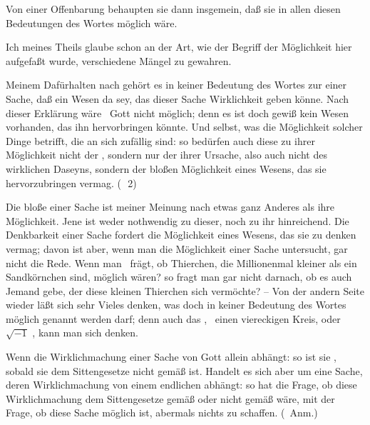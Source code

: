 \begin{aufza}
\item Von einer Offenbarung behaupten sie dann insgemein, daß sie in allen diesen Bedeutungen des Wortes möglich wäre.
\item Ich meines Theils glaube schon an der Art, wie der Begriff der Möglichkeit hier aufgefaßt wurde, verschiedene Mängel zu gewahren.
\begin{aufzb}
\item Meinem Dafürhalten nach gehört es in keiner Bedeutung des Wortes zur  einer Sache, daß ein Wesen da sey, das dieser Sache Wirklichkeit geben könne. Nach dieser Erklärung wäre \zB\ Gott nicht möglich; denn es ist doch gewiß kein Wesen vorhanden, das ihn hervorbringen könnte. Und selbst, was die Möglichkeit solcher Dinge betrifft, die an sich zufällig sind: so bedürfen auch diese zu ihrer Möglichkeit nicht der , sondern nur der  ihrer Ursache, also auch nicht des wirklichen Daseyns, sondern der bloßen Möglichkeit eines Wesens, das sie hervorzubringen vermag. (\ \no\,2)
\item Die bloße  einer Sache ist meiner Meinung nach etwas ganz Anderes als ihre Möglichkeit. Jene ist weder nothwendig zu dieser, noch zu ihr hinreichend. Die Denkbarkeit einer Sache fordert die Möglichkeit eines Wesens, das sie zu denken vermag; davon ist aber, wenn man die Möglichkeit einer Sache  untersucht, gar nicht die Rede. Wenn man \zB\ frägt, ob Thierchen, die Millionenmal kleiner als ein Sandkörnchen sind, möglich wären? so fragt man gar nicht darnach, ob es auch Jemand gebe, der diese kleinen Thierchen sich  vermöchte? -- Von der andern Seite wieder läßt sich sehr Vieles denken, was doch in keiner Bedeutung des Wortes möglich genannt werden darf; denn auch das , \zB\ einen viereckigen Kreis, oder $\sqrt{-1}$ \udgl , kann man sich denken.
\item Wenn die Wirklichmachung einer Sache von Gott allein abhängt: so ist sie , sobald sie dem Sittengesetze nicht gemäß ist. Handelt es sich aber um eine Sache, deren Wirklichmachung von einem endlichen  abhängt: so hat die Frage, ob diese Wirklichmachung dem Sittengesetze gemäß oder nicht gemäß wäre, mit der Frage, ob diese Sache möglich ist, abermals nichts zu schaffen. (\ Anm.)
\end{aufzb}
\end{aufza}

